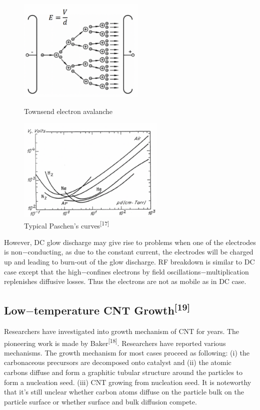 \begin{figure}[h]
\begin{minipage}[t]{0.5\textwidth}
\centering
\includegraphics[width=6cm]{src/fig/fig16.png}
\caption{Townsend electron avalanche}
\end{minipage}
\hfill
\begin{minipage}[t]{0.5\textwidth}
\includegraphics[width=7cm]{src/fig/fig17.png}
\caption{Typical Paschen’s curves\textsuperscript{[17]}}
\end{minipage}
\end{figure}
However, DC glow discharge may give rise to problems when one of the electrodes is non$-$conducting, as due to the constant current, the electrodes will be charged up and leading to burn-out of the glow discharge.  RF breakdown is similar to DC case except that the  high$-$confines electrons by ﬁeld oscillations$-$multiplication replenishes diffusive losses. Thus the electrons are not as mobile as in DC case.  
\subsection{Low$-$temperature CNT Growth\textsuperscript{[19]}}
Researchers have investigated into growth mechanism of CNT for years. The pioneering work is made by Baker\textsuperscript{[18]}. Researchers have reported various mechanisms. The growth mechanism for most cases proceed as following: (i) the carbonaceous precursors are decomposed onto catalyst and (ii) the atomic carbons diffuse and form a graphitic tubular structure around the particles to form a nucleation seed. (iii) CNT growing from nucleation seed.  It is noteworthy that it’s still unclear whether carbon atoms diffuse on the particle bulk on the particle surface or whether surface and bulk diffusion compete.  

